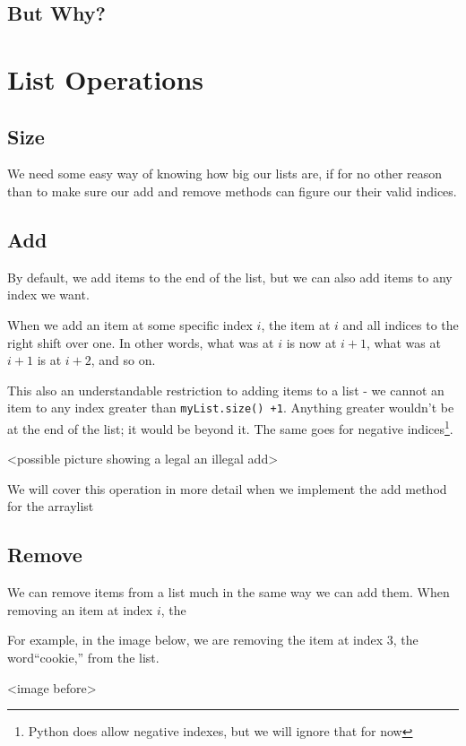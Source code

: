 \subsection{But Why?}





\section{List Operations}


\subsection{Size} We need some easy way of knowing how big our lists are, if for no other reason than to make sure our  add and remove methods can figure our their valid indices.


\subsection{Add}  By default, we add items to the end of the list, but we can also add items to any index we want.

When we add an item at some specific index $ i $, the item at $ i $ and all indices to the right shift over one.  In other words, what was at $ i $ is now at $ i+1 $, what was at $ i+1 $ is at $ i+2 $,  and so on.

This also an understandable restriction to adding items to a list -  we cannot an item to any index greater than \texttt{myList.size() +1}.   Anything greater wouldn't be at the end of the list; it would be beyond it.  The same goes for negative indices\footnote{Python does allow negative indexes, but we will ignore that for now}.
 
<possible picture showing a legal an illegal add>

We will cover this operation in more detail when we implement the add method for the arraylist 

\subsection{Remove}  We can remove items from a list much in the same way we can add them. When removing an item at index $i$, the 

For example, in the image below, we are removing the item at index 3, the word``cookie,'' from the list.


<image before>

